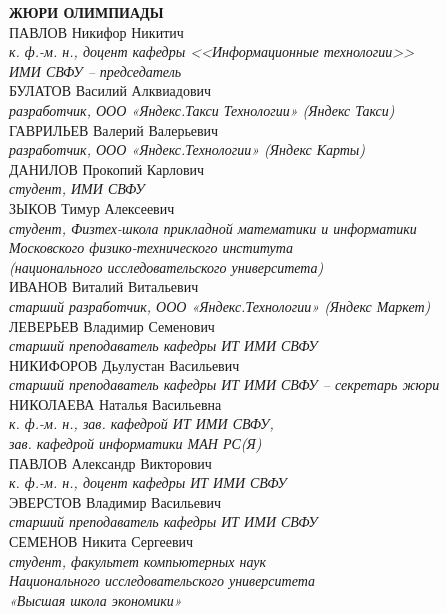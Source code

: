 \noindent
\textbf{ЖЮРИ ОЛИМПИАДЫ}
\\[2mm]
ПАВЛОВ Никифор Никитич \\
\textit{к. ф.-м. н., доцент кафедры <<Информационные технологии>>\\ ИМИ СВФУ -- председатель}
\\[2mm]
БУЛАТОВ Василий Алквиадович\\
\textit{разработчик, ООО «Яндекс.Такси Технологии» (Яндекс Такси)}
\\[2mm]
ГАВРИЛЬЕВ Валерий Валерьевич\\
\textit{разработчик, ООО «Яндекс.Технологии» (Яндекс Карты)}
\\[2mm]
ДАНИЛОВ Прокопий Карлович\\
\textit{студент, ИМИ СВФУ}
\\[2mm]
ЗЫКОВ Тимур Алексеевич\\ 
\textit{студент, Физтех-школа прикладной математики и информатики \\
Московского физико-технического института \\
(национального исследовательского университета)}
\\[2mm]
ИВАНОВ Виталий Витальевич\\
\textit{старший разработчик, ООО «Яндекс.Технологии» (Яндекс Маркет) }
\\[2mm]
ЛЕВЕРЬЕВ Владимир Семенович \\
\textit{старший преподаватель кафедры ИТ ИМИ СВФУ}
\\[2mm]
НИКИФОРОВ Дьулустан Васильевич \\
\textit{старший преподаватель кафедры ИТ ИМИ СВФУ
-- секретарь жюри}
\\[2mm]
НИКОЛАЕВА Наталья Васильевна \\
\textit{к. ф.-м. н., зав. кафедрой ИТ ИМИ СВФУ,\\
зав. кафедрой информатики МАН РС(Я)}
\\[2mm]
ПАВЛОВ Александр Викторович \\
\textit{к. ф.-м. н., доцент кафедры ИТ ИМИ СВФУ}
\\[2mm]
ЭВЕРСТОВ Владимир Васильевич \\
\textit{старший преподаватель кафедры ИТ ИМИ СВФУ}
\\[2mm]
СЕМЕНОВ Никита Сергеевич\\
\textit{студент, факультет компьютерных наук \\
Национального исследовательского университета \\
«Высшая школа экономики»}
